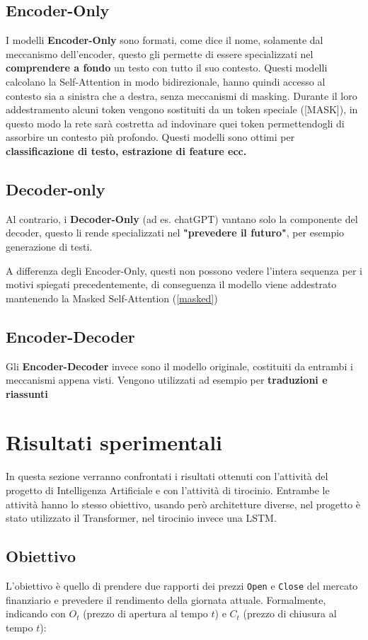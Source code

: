 \documentclass{article}
\begin{document}
\subsection{Encoder-Only}
I modelli \textbf{Encoder-Only} sono formati, come dice il nome, solamente dal meccanismo dell'encoder, questo gli permette di essere specializzati nel \textbf{comprendere a fondo} un testo con tutto il suo contesto.
Questi modelli calcolano la Self-Attention in modo bidirezionale, hanno quindi accesso al contesto sia a sinistra che a destra, senza meccanismi di masking.
Durante il loro addestramento alcuni token vengono sostituiti da un token speciale ([MASK]), in questo modo la rete sarà costretta ad indovinare quei token permettendogli di assorbire un contesto più profondo.
Questi modelli sono ottimi per \textbf{classificazione di testo, estrazione di feature ecc.}

\subsection{Decoder-only}
Al contrario, i \textbf{Decoder-Only} (ad es. chatGPT) vantano solo la componente del decoder, questo li rende specializzati nel \textbf{"prevedere il futuro"}, per esempio generazione di testi.

A differenza degli Encoder-Only, questi non possono vedere l'intera sequenza per i motivi spiegati precedentemente, di conseguenza il modello viene addestrato mantenendo la Masked Self-Attention (\ref{masked})

\subsection{Encoder-Decoder}
Gli \textbf{Encoder-Decoder} invece sono il modello originale, costituiti da entrambi i meccanismi appena visti.
Vengono utilizzati ad esempio per \textbf{traduzioni e riassunti}

\section{Risultati sperimentali}
In questa sezione verranno confrontati i risultati ottenuti con l'attività del progetto di Intelligenza Artificiale e con l'attività di tirocinio.
Entrambe le attività hanno lo stesso obiettivo, usando però architetture diverse, nel progetto è stato utilizzato il Transformer, nel tirocinio invece una LSTM.
\subsection{Obiettivo}
L'obiettivo è quello di prendere due rapporti dei prezzi \texttt{Open} e \texttt{Close} del mercato finanziario e prevedere il rendimento della giornata attuale. \newline
Formalmente, indicando con $O_t$ (prezzo di apertura al tempo $t$) e $C_t$ (prezzo di chiusura al tempo $t$):
\end{document}
